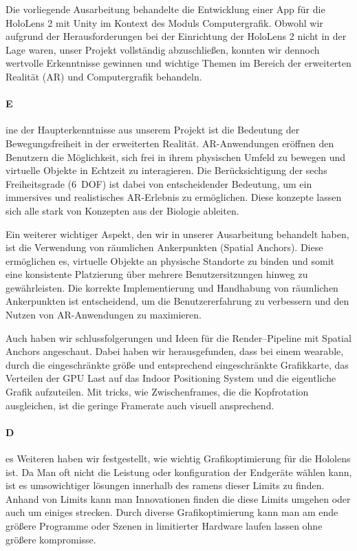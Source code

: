 Die vorliegende Ausarbeitung behandelte die Entwicklung einer App für die HoloLens 2 mit Unity im Kontext des Moduls Computergrafik.
Obwohl wir aufgrund der Herausforderungen bei der Einrichtung der HoloLens 2 nicht in der Lage waren, unser Projekt vollständig abzuschließen, konnten wir dennoch wertvolle Erkenntnisse gewinnen und wichtige Themen im Bereich der erweiterten Realität (AR) und Computergrafik behandeln.

\paragraph{E}ine der Haupterkenntnisse aus unserem Projekt ist die Bedeutung der Bewegungsfreiheit in der erweiterten Realität.
    AR-Anwendungen eröffnen den Benutzern die Möglichkeit, sich frei in ihrem physischen Umfeld zu bewegen und virtuelle Objekte in Echtzeit zu interagieren.
    Die Berücksichtigung der sechs Freiheitsgrade (6~DOF) ist dabei von entscheidender Bedeutung, um ein immersives und realistisches AR-Erlebnis zu ermöglichen.
    Diese konzepte lassen sich alle stark von Konzepten aus der Biologie ableiten.


    Ein weiterer wichtiger Aspekt, den wir in unserer Ausarbeitung behandelt haben, ist die Verwendung von räumlichen Ankerpunkten (Spatial Anchors).
    Diese ermöglichen es, virtuelle Objekte an physische Standorte zu binden und somit eine konsistente Platzierung über mehrere Benutzersitzungen hinweg zu gewährleisten.
    Die korrekte Implementierung und Handhabung von räumlichen Ankerpunkten ist entscheidend, um die Benutzererfahrung zu verbessern und den Nutzen von AR-Anwendungen zu maximieren.

    Auch haben wir schlussfolgerungen und Ideen für die Render--Pipeline mit Spatial Anchors angeschaut.
    Dabei haben wir herausgefunden, dass bei einem wearable, durch die eingeschränkte größe und entsprechend eingeschränkte Grafikkarte, das Verteilen der GPU Last auf das Indoor Positioning System und die eigentliche Grafik aufzuteilen.
    Mit tricks, wie Zwischenframes, die die Kopfrotation ausgleichen, ist die geringe Framerate auch visuell ansprechend.

\paragraph{D}es Weiteren haben wir festgestellt, wie wichtig Grafikoptimierung für die Hololens ist.
    Da Man oft nicht die Leistung oder konfiguration der Endgeräte wählen kann, ist es umsowichtiger lösungen innerhalb des ramens dieser Limits zu finden.
    Anhand von Limits kann man Innovationen finden die diese Limits umgehen oder auch um einiges strecken.
    Durch diverse Grafikoptimierung kann man am ende größere Programme oder Szenen in limitierter Hardware laufen lassen ohne größere kompromisse.

